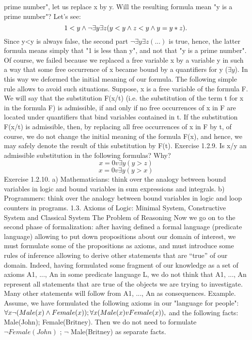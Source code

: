 prime number", let us replace x by y. Will the resulting formula mean "y is a prime number"? Let's see:
\[1<y \wedge  \neg \exists y\exists z(y<y \wedge  z<y \wedge  y=y*z).\]
Since y<y is always false, the second part \(\neg \exists y\exists z(...)\) is true, hence, the latter formula means simply that
"1 is less than y", and not that "y is a prime number".
Of course, we failed because we replaced a free variable x by a variable y in such a way that some free
occurrence of x became bound by a quantifiers for y (\(\exists y\)). In this way we deformed the initial meaning
of our formula.
The following simple rule allows to avoid such situations. Suppose, x is a free variable of the formula F.
We will say that the substitution F(x/t) (i.e. the substitution of the term t for x in the formula F) is
admissible, if and only if no free occurrences of x in F are located under quantifiers that bind variables
contained in t. If the substitution F(x/t) is admissible, then, by replacing all free occurrences of x in F by t,
of course, we do not change the initial meaning of the formula F(x), and hence, we may safely denote the
result of this substitution by F(t).
Exercise 1.2.9. Is x/y an admissible substitution in the following formulas? Why?
\[x=0 v \exists y(y>z)\]
\[x=0 v \exists y(y>x)\]
Exercise 1.2.10. a) Mathematicians: think over the analogy between bound variables in logic and bound
variables in sum expressions and integrals.
b) Programmers: think over the analogy between bound variables in logic and loop counters in programs.
1.3. Axioms of Logic: Minimal System, Constructive System and Classical System
The Problem of Reasoning
Now we go on to the second phase of formalization: after having defined a formal language (predicate
language) allowing to put down propositions about our domain of interest, we must formulate some of the
propositions as axioms, and must introduce some rules of inference allowing to derive other statements
that are ``true'' of our domain.
Indeed, having formulated some fragment of our knowledge as a set of axioms A1, ..., An in some
predicate language L, we do not think that A1, ..., An represent all statements that are true of the objects
we are trying to investigate. Many other statements will follow from A1, ..., An as consequences.
Example. Assume, we have formulated the following axioms in our "language for people":
\(\forall x\neg (Male(x)\wedge Female(x)); \forall x(Male(x)vFemale(x)),\) and the following facts: Male(John);
Female(Britney). Then we do not need to formulate \(\neg Female(John)\) ; \(\neg\) Male(Britney) as separate facts.
